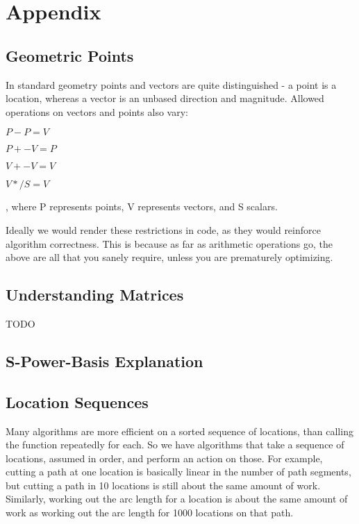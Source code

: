 \documentclass{book}
\begin{document}
\chapter{Appendix}
\renewcommand{\thesection}{\Alph{section}.}

\section{Geometric Points}
In standard geometry points and vectors are quite distinguished - a  
point is a location, whereas a vector is an unbased direction and
magnitude.  Allowed operations on vectors and points also vary:

$P  - P = V$

$P +- V = P$

$V +- V = V$

$V */ S = V$

, where P represents points, V represents vectors, and S scalars.

Ideally we would render these restrictions in code, as they would
reinforce algorithm correctness.  This is because as far as arithmetic
operations go, the above are all that you sanely require, unless you
are prematurely optimizing.

\section{Understanding Matrices}

TODO

\section{S-Power-Basis Explanation}

\section{Location Sequences}

Many algorithms are more efficient on a sorted sequence of locations,
than calling the function repeatedly for each.  So we have algorithms
that take a sequence of locations, assumed in order, and perform an
action on those.  For example, cutting a path at one location is
basically linear in the number of path segments, but cutting a path in
10 locations is still about the same amount of work.  Similarly,
working out the arc length for a location is about the same amount of
work as working out the arc length for 1000 locations on that path.
\end{document}
